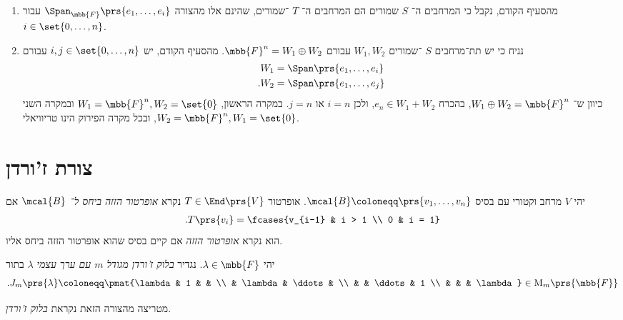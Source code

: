\documentclass[a4paper,10pt,twoside,openany]{book}
\renewcommand{\Mat}{\mathrm{M}}
\begin{document}
\begin{solution}
\begin{enumerate}
אם
$W \leq V$
תת־מרחב
$\prs{N + \lambda \id_V}$%
־שמור, נקבל מהכיוון הראשון שהוא
$\prs{N + \lambda \id_V} + \prs{-\lambda}\id_V$%
־שמור, כלומר
$N$%
־שמור.

\item
מהסעיף הקודם, נקבל כי המרחבים ה־%
$S$
שמורים הם המרחבים ה־%
$T$%
־שמורים, שהינם אלו מהצורה
$\Span_{\mbb{F}}\prs{e_1, \ldots, e_i}$
עבור
$i \in \set{0, \ldots, n}$.

\item
נניח כי יש תת־מרחבים
$S$%
־שמורים
$W_1, W_2$
עבורם
$\mbb{F}^n = W_1 \oplus W_2$.
מהסעיף הקודם, יש
$i,j \in \set{0, \ldots, n}$
עבורם
\begin{align*}
W_1 &= \Span\prs{e_1, \ldots, e_i} \\
\text{.} W_2 &= \Span\prs{e_1, \ldots, e_j}
\end{align*}
כיוון ש־%
$W_1 \oplus W_2 = \mbb{F}^n$,
בהכרח
$e_n \in W_1 + W_2$,
ולכן
$i = n$
או
$j = n$.
במקרה הראשון,
$W_1 = \mbb{F}^n, W_2 = \set{0}$
ובמקרה השני
$W_2 = \mbb{F}^n, W_1 = \set{0}$,
ובכל מקרה הפירוק הינו טריוויאלי.
\end{enumerate}
\end{solution}

\section{צורת ז'ורדן}

\begin{definition}
יהי
$V$
מרחב וקטורי עם בסיס
$\mcal{B} \coloneqq \prs{v_1, \ldots, v_n}$.
אופרטור
$T \in \End\prs{V}$
נקרא
\emph{אופרטור הזזה ביחס ל־%
$\mcal{B}$}
אם
\begin{align*}
\text{.} T\prs{v_i} = \fcases{v_{i-1} & i > 1 \\ 0 & i = 1}
\end{align*}
הוא נקרא
\emph{אופרטור הזזה}
אם קיים בסיס שהוא אופרטור הזזה ביחס אליו.
\end{definition}

\begin{definition}
יהי
$\lambda \in \mbb{F}$.
נגדיר
\emph{בלוק ז'ורדן מגודל
$m$
עם ערך עצמי
$\lambda$}
בתור
\begin{align*}
\text{.} J_m\prs{\lambda} \coloneqq \pmat{\lambda & 1 & & \\ & \lambda & \ddots & \\ & & \ddots & 1 \\ & & & \lambda} \in \Mat_m\prs{\mbb{F}}
\end{align*}

מטריצה מהצורה הזאת נקראת
\emph{בלוק ז'ורדן}.
\end{definition}
\end{document}
